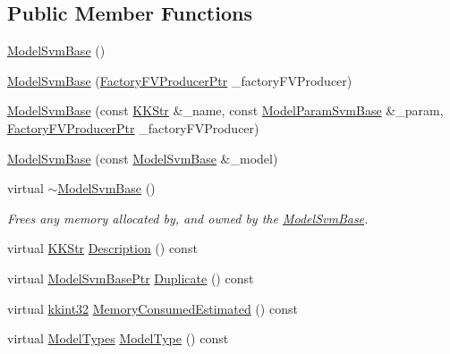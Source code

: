 \subsection*{Public Member Functions}
\begin{DoxyCompactItemize}
\item 
\hyperlink{class_k_k_m_l_l_1_1_model_svm_base_a6629fe8fe9c0b597f18f61b44d123166}{Model\+Svm\+Base} ()
\item 
\hyperlink{class_k_k_m_l_l_1_1_model_svm_base_ad902e194d8bd45ee3aa336b109556e5a}{Model\+Svm\+Base} (\hyperlink{namespace_k_k_m_l_l_a82812d1feb85a6cff72d059bc67bb90e}{Factory\+F\+V\+Producer\+Ptr} \+\_\+factory\+F\+V\+Producer)
\item 
\hyperlink{class_k_k_m_l_l_1_1_model_svm_base_a1235d57dd5bfeaae45a02eab8e6e7356}{Model\+Svm\+Base} (const \hyperlink{class_k_k_b_1_1_k_k_str}{K\+K\+Str} \&\+\_\+name, const \hyperlink{class_k_k_m_l_l_1_1_model_param_svm_base}{Model\+Param\+Svm\+Base} \&\+\_\+param, \hyperlink{namespace_k_k_m_l_l_a82812d1feb85a6cff72d059bc67bb90e}{Factory\+F\+V\+Producer\+Ptr} \+\_\+factory\+F\+V\+Producer)
\item 
\hyperlink{class_k_k_m_l_l_1_1_model_svm_base_a74e8ba00cbd25cfb4f3477991488ce0b}{Model\+Svm\+Base} (const \hyperlink{class_k_k_m_l_l_1_1_model_svm_base}{Model\+Svm\+Base} \&\+\_\+model)
\item 
virtual \hyperlink{class_k_k_m_l_l_1_1_model_svm_base_a3f4de50c1c6def5e0fddab7f7a7ebeaf}{$\sim$\+Model\+Svm\+Base} ()
\begin{DoxyCompactList}\small\item\em Frees any memory allocated by, and owned by the \hyperlink{class_k_k_m_l_l_1_1_model_svm_base}{Model\+Svm\+Base}. \end{DoxyCompactList}\item 
virtual \hyperlink{class_k_k_b_1_1_k_k_str}{K\+K\+Str} \hyperlink{class_k_k_m_l_l_1_1_model_svm_base_ae3132e60f8abe1ec9dc5f24a138002a4}{Description} () const 
\item 
virtual \hyperlink{class_k_k_m_l_l_1_1_model_svm_base_aa84f0e9baebb7df8a61acf1cf41a4461}{Model\+Svm\+Base\+Ptr} \hyperlink{class_k_k_m_l_l_1_1_model_svm_base_af90f87dfb7e95ca4f50ac7d6375c24c9}{Duplicate} () const 
\item 
virtual \hyperlink{namespace_k_k_b_a8fa4952cc84fda1de4bec1fbdd8d5b1b}{kkint32} \hyperlink{class_k_k_m_l_l_1_1_model_svm_base_ab56ab55eaf75a53ccb876ba98079c628}{Memory\+Consumed\+Estimated} () const 
\item 
virtual \hyperlink{class_k_k_m_l_l_1_1_model_aeda4060e088c67446ca993eefcecea06}{Model\+Types} \hyperlink{class_k_k_m_l_l_1_1_model_svm_base_a9b7d0d490d949e499884b4cbf94f8651}{Model\+Type} () const 

\end{DoxyCompactItemize}
